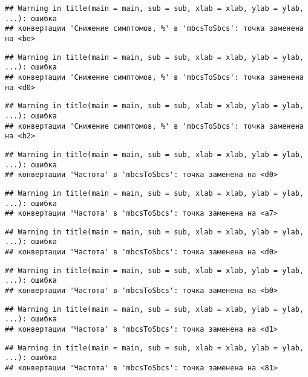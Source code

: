 \documentclass[
]{article}
\begin{document}
\begin{verbatim}
## Warning in title(main = main, sub = sub, xlab = xlab, ylab = ylab, ...): ошибка
## конвертации 'Снижение симптомов, %' в 'mbcsToSbcs': точка заменена на <be>
\end{verbatim}

\begin{verbatim}
## Warning in title(main = main, sub = sub, xlab = xlab, ylab = ylab, ...): ошибка
## конвертации 'Снижение симптомов, %' в 'mbcsToSbcs': точка заменена на <d0>
\end{verbatim}

\begin{verbatim}
## Warning in title(main = main, sub = sub, xlab = xlab, ylab = ylab, ...): ошибка
## конвертации 'Снижение симптомов, %' в 'mbcsToSbcs': точка заменена на <b2>
\end{verbatim}

\begin{verbatim}
## Warning in title(main = main, sub = sub, xlab = xlab, ylab = ylab, ...): ошибка
## конвертации 'Частота' в 'mbcsToSbcs': точка заменена на <d0>
\end{verbatim}

\begin{verbatim}
## Warning in title(main = main, sub = sub, xlab = xlab, ylab = ylab, ...): ошибка
## конвертации 'Частота' в 'mbcsToSbcs': точка заменена на <a7>
\end{verbatim}

\begin{verbatim}
## Warning in title(main = main, sub = sub, xlab = xlab, ylab = ylab, ...): ошибка
## конвертации 'Частота' в 'mbcsToSbcs': точка заменена на <d0>
\end{verbatim}

\begin{verbatim}
## Warning in title(main = main, sub = sub, xlab = xlab, ylab = ylab, ...): ошибка
## конвертации 'Частота' в 'mbcsToSbcs': точка заменена на <b0>
\end{verbatim}

\begin{verbatim}
## Warning in title(main = main, sub = sub, xlab = xlab, ylab = ylab, ...): ошибка
## конвертации 'Частота' в 'mbcsToSbcs': точка заменена на <d1>
\end{verbatim}

\begin{verbatim}
## Warning in title(main = main, sub = sub, xlab = xlab, ylab = ylab, ...): ошибка
## конвертации 'Частота' в 'mbcsToSbcs': точка заменена на <81>
\end{verbatim}
\end{document}
